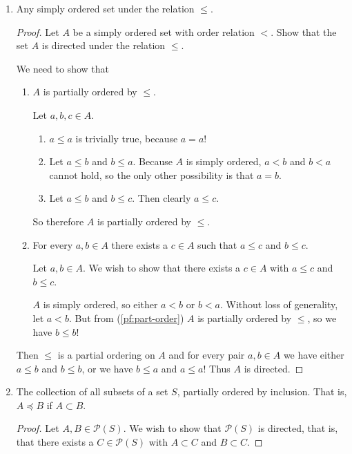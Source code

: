\documentclass[12pt]{article}
\begin{document}
\begin{enumerate}
    \item Any simply ordered set under the relation $\leq$.
          \begin{proof}
              Let $A$ be a simply ordered set with order relation $<$. Show that the set $A$ is
              directed under the relation $\leq$.

              We need to show that
              \begin{enumerate}
                  \item\label{pf:part-order} $A$ is partially ordered by $\leq$.

                        Let $a, b, c \in A$.
                        \begin{enumerate}
                            \item $a \leq a$ is trivially true, because $a = a$!
                            \item Let $a \leq b$ and $b \leq a$. Because $A$ is simply ordered, $a
                                      < b$ and $b < a$ cannot hold, so the only other possibility
                                  is that $a = b$.
                            \item Let $a \leq b$ and $b \leq c$. Then clearly $a \leq c$.
                        \end{enumerate}
                        So therefore $A$ is partially ordered by $\leq$.
                  \item\label{pf:part-directed} For every $a, b \in A$ there exists a $c \in A$
                        such that $a \leq c$ and $b \leq c$.

                        Let $a, b \in A$. We wish to show that there exists a $c \in A$ with $a
                            \leq c$ and $b \leq c$.

                        $A$ is simply ordered, so either $a < b$ or $b < a$. Without loss of
                        generality, let $a < b$. But from (\ref{pf:part-order}) $A$ is partially
                        ordered by $\leq$, so we
                        have $b \leq b$!
              \end{enumerate}
              Then $\leq$ is a partial ordering on $A$ and for every pair $a, b \in A$ we have
              either $a \leq b$ and $b \leq b$, or we have $b \leq a$ and $a \leq a$! Thus $A$ is
              directed.
          \end{proof}

    \item The collection of all subsets of a set $S$, partially ordered by inclusion. That is, $A
              \preceq B$ if $A \subset B$.
          \begin{proof}
              Let $A, B \in \mathcal P(S)$. We wish to show that $\mathcal P(S)$ is directed, that
              is, that there exists a $C \in \mathcal P(S)$ with $A \subset C$ and $B \subset C$.


\end{proof}
\end{enumerate}
\end{document}
